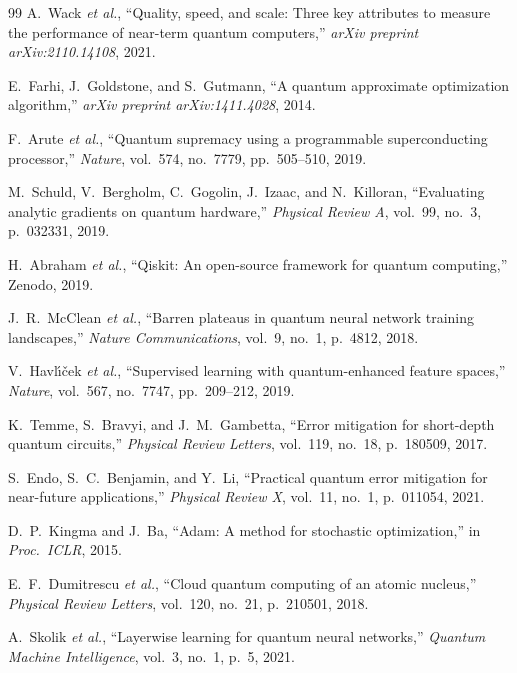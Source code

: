 \documentclass[final,5p,times,number]{elsarticle}
\begin{document}
\begin{thebibliography}{99}
  A.~Wack \emph{et al.}, ``Quality, speed, and scale: Three key attributes to measure the performance of near-term quantum computers,'' \emph{arXiv preprint arXiv:2110.14108}, 2021.

  E.~Farhi, J.~Goldstone, and S.~Gutmann, ``A quantum approximate optimization algorithm,'' \emph{arXiv preprint arXiv:1411.4028}, 2014.

  F.~Arute \emph{et al.}, ``Quantum supremacy using a programmable superconducting processor,'' \emph{Nature}, vol.~574, no.~7779, pp.~505--510, 2019.

  M.~Schuld, V.~Bergholm, C.~Gogolin, J.~Izaac, and N.~Killoran, ``Evaluating analytic gradients on quantum hardware,'' \emph{Physical Review A}, vol.~99, no.~3, p.~032331, 2019.

  H.~Abraham \emph{et al.}, ``Qiskit: An open-source framework for quantum computing,'' Zenodo, 2019.

  J.~R.~McClean \emph{et al.}, ``Barren plateaus in quantum neural network training landscapes,'' \emph{Nature Communications}, vol.~9, no.~1, p.~4812, 2018.

  V.~Havl{\'{\i}}\v{c}ek \emph{et al.}, ``Supervised learning with quantum-enhanced feature spaces,'' \emph{Nature}, vol.~567, no.~7747, pp.~209--212, 2019.

  K.~Temme, S.~Bravyi, and J.~M.~Gambetta, ``Error mitigation for short-depth quantum circuits,'' \emph{Physical Review Letters}, vol.~119, no.~18, p.~180509, 2017.

  S.~Endo, S.~C.~Benjamin, and Y.~Li, ``Practical quantum error mitigation for near-future applications,'' \emph{Physical Review X}, vol.~11, no.~1, p.~011054, 2021.

  D.~P.~Kingma and J.~Ba, ``Adam: A method for stochastic optimization,'' in \emph{Proc.\ ICLR}, 2015.

  E.~F.~Dumitrescu \emph{et al.}, ``Cloud quantum computing of an atomic nucleus,'' \emph{Physical Review Letters}, vol.~120, no.~21, p.~210501, 2018.

  A.~Skolik \emph{et al.}, ``Layerwise learning for quantum neural networks,'' \emph{Quantum Machine Intelligence}, vol.~3, no.~1, p.~5, 2021.


\end{thebibliography}
\end{document}
